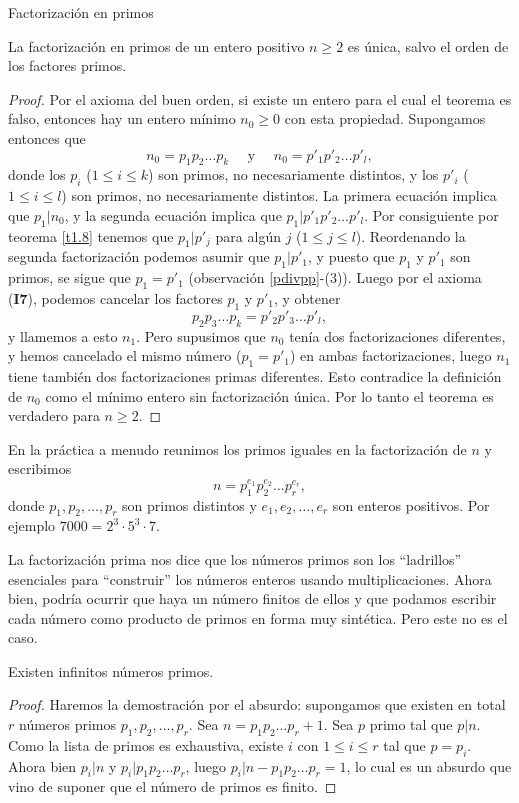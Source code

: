 \begin{section}{Factorización en primos}
\begin{teorema}\label{t1.8.2} La factorización en primos de un entero
positivo $n\ge 2$ es única, salvo el orden de los factores primos.
\end{teorema}
\begin{proof} Por el axioma del buen orden, si existe un
entero para el cual el teorema es falso, entonces hay un entero
mínimo $n_0\ge 0$ con esta propiedad. Supongamos entonces que
$$
n_0= p_1p_2\ldots p_k\quad\text{ y }\quad n_0= p'_1p'_2\ldots
p'_l,
$$
donde los $p_i$ ($1\le i \le k$) son primos, no necesariamente
distintos, y los $p'_i$ ($1\le i \le l$) son primos, no
necesariamente distintos. La primera ecuación implica que
$p_1|n_0$, y la segunda ecuación implica que $p_1 | p'_1p'_2\ldots
p'_l$. Por consiguiente por teorema \ref{t1.8} tenemos que $p_1|p'_j$
para algún $j$ ($1\le j \le l$). Reordenando la segunda
factorización podemos asumir que $p_1 | p'_1$, y puesto que $p_1$
y $p'_1$ son primos, se sigue que $p_1=p'_1$ (observación \ref{pdivpp}-(3)). Luego
por el axioma ({\bf I7}), podemos cancelar los factores $p_1$ y
$p'_1$, y obtener
$$
p_2p_3 \ldots p_k = p'_2p'_3 \ldots p'_l,
$$
y llamemos a esto $n_1$. Pero supusimos que $n_0$ tenía dos
factorizaciones diferentes, y hemos cancelado el mismo número
($p_1=p'_1$) en ambas factorizaciones, luego $n_1$ tiene también
dos factorizaciones primas diferentes. Esto contradice la
definición de $n_0$ como el mínimo entero sin factorización única.
Por lo tanto el teorema es verdadero para $n\ge 2$.
\end{proof}




En la práctica a menudo reunimos los primos iguales en la
factorización de $n$ y escribimos
\begin{equation}\label{factpri}
n=p_1^{e_1}p_2^{e_2}\ldots p_r^{e_r},
\end{equation}
donde $p_1,p_2,\ldots ,p_r$ son primos distintos y $e_1,e_2,\ldots,e_r$ son enteros positivos. Por ejemplo $ 7000 = 2^3 \cdot 5^3
\cdot 7$.


La factorización prima nos dice que los números primos son los  ``ladrillos'' esenciales para ``cons\-truir'' los números enteros usando multiplicaciones. Ahora bien, podría ocurrir que haya un número finitos de ellos y que podamos escribir cada número como producto de primos en forma muy sintética. Pero este no es el caso.

\begin{proposicion} Existen infinitos números primos. 
\end{proposicion} 
\begin{proof} Haremos la demostración por el absurdo: supongamos que existen en total $r$ números primos $p_1,p_2,\ldots, p_r$. Sea $n =  p_1p_2\ldots p_r+1$. Sea $p$ primo tal que $p|n$. Como la lista de primos es exhaustiva, existe $i$ con $1 \le i \le r$ tal que $p=p_i$. Ahora bien $p_i| n$ y $p_i|p_1p_2\ldots p_r$, luego $p_i|n-p_1p_2\ldots p_r =1$, lo cual es un absurdo que vino de suponer que el número de primos es finito.  
\end{proof}




\end{section}
